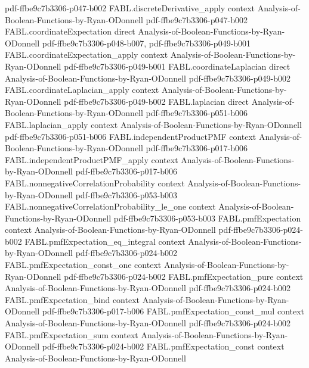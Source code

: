 \begin{theorem}
{    pdf-ffbe9c7b3306-p047-b002}
\proofstep
  {FABL.discreteDerivative_apply}
  {context}
  {Analysis-of-Boolean-Functions-by-Ryan-ODonnell}
  {pdf-ffbe9c7b3306-p047-b002}
\proofstep
  {FABL.coordinateExpectation}
  {direct}
  {Analysis-of-Boolean-Functions-by-Ryan-ODonnell}
  {pdf-ffbe9c7b3306-p048-b007,
    pdf-ffbe9c7b3306-p049-b001}
\proofstep
  {FABL.coordinateExpectation_apply}
  {context}
  {Analysis-of-Boolean-Functions-by-Ryan-ODonnell}
  {pdf-ffbe9c7b3306-p049-b001}
\proofstep
  {FABL.coordinateLaplacian}
  {direct}
  {Analysis-of-Boolean-Functions-by-Ryan-ODonnell}
  {pdf-ffbe9c7b3306-p049-b002}
\proofstep
  {FABL.coordinateLaplacian_apply}
  {context}
  {Analysis-of-Boolean-Functions-by-Ryan-ODonnell}
  {pdf-ffbe9c7b3306-p049-b002}
\proofstep
  {FABL.laplacian}
  {direct}
  {Analysis-of-Boolean-Functions-by-Ryan-ODonnell}
  {pdf-ffbe9c7b3306-p051-b006}
\proofstep
  {FABL.laplacian_apply}
  {context}
  {Analysis-of-Boolean-Functions-by-Ryan-ODonnell}
  {pdf-ffbe9c7b3306-p051-b006}
\proofstep
  {FABL.independentProductPMF}
  {context}
  {Analysis-of-Boolean-Functions-by-Ryan-ODonnell}
  {pdf-ffbe9c7b3306-p017-b006}
\proofstep
  {FABL.independentProductPMF_apply}
  {context}
  {Analysis-of-Boolean-Functions-by-Ryan-ODonnell}
  {pdf-ffbe9c7b3306-p017-b006}
\proofstep
  {FABL.nonnegativeCorrelationProbability}
  {context}
  {Analysis-of-Boolean-Functions-by-Ryan-ODonnell}
  {pdf-ffbe9c7b3306-p053-b003}
\proofstep
  {FABL.nonnegativeCorrelationProbability_le_one}
  {context}
  {Analysis-of-Boolean-Functions-by-Ryan-ODonnell}
  {pdf-ffbe9c7b3306-p053-b003}
\proofstep
  {FABL.pmfExpectation}
  {context}
  {Analysis-of-Boolean-Functions-by-Ryan-ODonnell}
  {pdf-ffbe9c7b3306-p024-b002}
\proofstep
  {FABL.pmfExpectation_eq_integral}
  {context}
  {Analysis-of-Boolean-Functions-by-Ryan-ODonnell}
  {pdf-ffbe9c7b3306-p024-b002}
\proofstep
  {FABL.pmfExpectation_const_one}
  {context}
  {Analysis-of-Boolean-Functions-by-Ryan-ODonnell}
  {pdf-ffbe9c7b3306-p024-b002}
\proofstep
  {FABL.pmfExpectation_pure}
  {context}
  {Analysis-of-Boolean-Functions-by-Ryan-ODonnell}
  {pdf-ffbe9c7b3306-p024-b002}
\proofstep
  {FABL.pmfExpectation_bind}
  {context}
  {Analysis-of-Boolean-Functions-by-Ryan-ODonnell}
  {pdf-ffbe9c7b3306-p017-b006}
\proofstep
  {FABL.pmfExpectation_const_mul}
  {context}
  {Analysis-of-Boolean-Functions-by-Ryan-ODonnell}
  {pdf-ffbe9c7b3306-p024-b002}
\proofstep
  {FABL.pmfExpectation_sum}
  {context}
  {Analysis-of-Boolean-Functions-by-Ryan-ODonnell}
  {pdf-ffbe9c7b3306-p024-b002}
\proofstep
  {FABL.pmfExpectation_const}
  {context}
  {Analysis-of-Boolean-Functions-by-Ryan-ODonnell}

\end{theorem}
